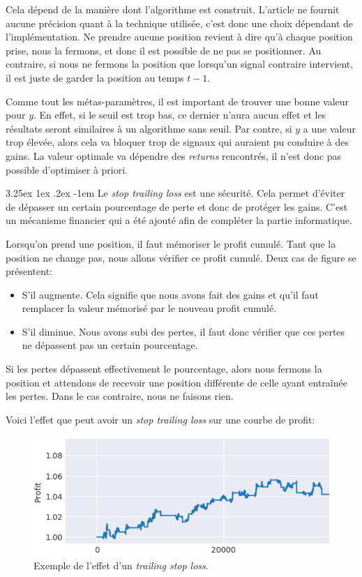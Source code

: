 \documentclass[a4paper, 11pt]{article}
\makeatletter
\renewcommand\paragraph{\@startsection{paragraph}{5}{\z@}%
  {3.25ex \@plus1ex \@minus.2ex}%
  {-1em}%
  {\normalfont\normalsize\bfseries}}
\makeatother
\begin{document}
Cela dépend de la manière dont l'algorithme est construit. L'article ne fournit aucune précision quant à la technique utilisée, c'est donc une choix
dépendant de l'implémentation. Ne prendre aucune position revient à dire qu'à chaque position prise, nous la fermons, et donc il est possible de ne pas
se positionner. Au contraire, si nous ne fermons la position que lorsqu'un signal contraire intervient, il est juste de garder la position au temps $t-1$.

Comme tout les métas-paramètres, il est important de trouver une bonne valeur pour $y$. En effet, si le seuil est trop bas, ce dernier n'aura aucun effet 
et les résultats seront similaires à un algorithme sans seuil. Par contre, si $y$ a une valeur trop élevée, alors cela va bloquer trop de signaux qui
auraient pu conduire à des gains. La valeur optimale va dépendre des \textit{returns} rencontrés, il n'est donc pas possible d'optimiser à priori.

\paragraph{}
Le \textit{stop trailing loss} est une sécurité. Cela permet d'éviter de dépasser un certain pourcentage de perte et donc de protéger les gains. C'est un
mécanisme financier qui a été ajouté afin de compléter la partie informatique.

Lorsqu'on prend une position, il faut mémoriser le profit cumulé. Tant que la position ne change pas, nous allons vérifier ce profit cumulé. Deux cas de
figure se présentent:
\begin{itemize}
 \item S'il augmente. Cela signifie que nous avons fait des gains et qu'il faut remplacer la valeur mémorisé par le nouveau profit cumulé.
 \item S'il diminue. Nous avons subi des pertes, il faut donc vérifier que ces pertes ne dépassent pas un certain pourcentage.
\end{itemize}

Si les pertes dépassent effectivement le pourcentage, alors nous fermons la position et attendons de recevoir une position différente de celle ayant
entraînée les pertes. Dans le cas contraire, nous ne faisons rien.

Voici l'effet que peut avoir un \textit{stop trailing loss} sur une courbe de profit:
\begin{figure}[H]
\centering
\includegraphics[scale=0.5]{images/stop_loss}
\caption{Exemple de l'effet d'un \textit{trailing stop loss}.}
\end{figure}
\end{document}
